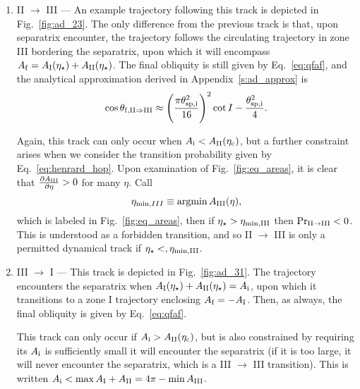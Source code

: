\documentclass[
        fleqn,
        usenatbib,
        referee,
    ]{mnras}
\newcommand*{\pd}[2]{\frac{\partial#1}{\partial#2}}
\newcommand*{\p}[1]{\left(#1\right)}
\DeclareMathOperator*{\argmin}{argmin}
\begin{document}
\begin{enumerate}
    \item II $\to$ III --- An example trajectory following this track is
        depicted in Fig.~\ref{fig:ad_23}. The only difference from the previous
        track is that, upon separatrix encounter, the trajectory follows the
        circulating trajectory in zone III bordering the separatrix, upon
        which it will encompass $A_{\rm f} = A_{\rm I}(\eta_\star) + A_{\rm
        II}(\eta_\star)$. The final obliquity is still given by
        Eq.~\eqref{eq:qfaf}, and the analytical approximation derived in
        Appendix~\ref{s:ad_approx} is
        \begin{equation}
            \cos \theta_{\rm f, II \Rightarrow III} \approx
                \p{\frac{\pi \theta_{\rm sp, i}^2}{16}}^2 \cot I
                    - \frac{\theta_{\rm sp, i}^2}{4}.\label{eq:qf_23_approx}
        \end{equation}

        Again, this track can only occur when $A_{\rm i} < A_{\rm II}(\eta_{\rm c})$, but a
        further constraint arises when we consider the transition probability
        given by Eq.~\eqref{eq:henrard_hop}. Upon examination of
        Fig.~\ref{fig:eq_areas}, it is clear that $\pd{A_{\rm III}}{\eta} > 0$ for
        many $\eta$. Call
        \begin{equation}
            \eta_{\min, III} \equiv \argmin A_{\rm III}(\eta)
                \label{eq:eta_minIII},
        \end{equation}
        which is labeled in Fig.~\ref{fig:eq_areas}, then if $\eta_\star >
        \eta_{\rm \min, III}$ then $\Pr_{\rm II \to III} < 0$. This is
        understood as a forbidden transition, and so II $\to$ III is only a
        permitted dynamical track if $\eta_\star <, \eta_{\rm \min, III}$.

    \item III $\to$ I --- This track is depicted in Fig.~\ref{fig:ad_31}.
        The trajectory encounters the separatrix when $A_{\rm I}(\eta_\star) +
        A_{\rm II}(\eta_\star) = A_{\rm i}$, upon which it transitions to a zone
        I trajectory enclosing $A_{\rm f} = -A_{\rm I}$. Then, as always, the
        final obliquity is given by Eq.~\eqref{eq:qfaf}.

        This track can only occur if $A_{\rm i} > A_{\rm II}(\eta_{\rm c})$, but is also
        constrained by requiring its $A_{\rm i}$ is sufficiently small it will
        encounter the separatrix (if it is too large, it will never encounter
        the separatrix, which is a III $\to$ III transition). This is written
        $A_{\rm i} < \max A_{\rm I} + A_{\rm II} = 4\pi - \min A_{\rm III}$.


\end{enumerate}
\end{document}
